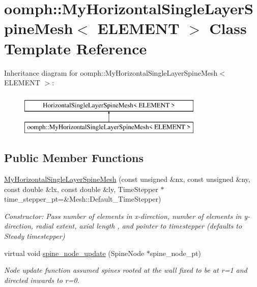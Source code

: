 \hypertarget{classoomph_1_1MyHorizontalSingleLayerSpineMesh}{}\section{oomph\+:\+:My\+Horizontal\+Single\+Layer\+Spine\+Mesh$<$ E\+L\+E\+M\+E\+NT $>$ Class Template Reference}
\label{classoomph_1_1MyHorizontalSingleLayerSpineMesh}
Inheritance diagram for oomph\+:\+:My\+Horizontal\+Single\+Layer\+Spine\+Mesh$<$ E\+L\+E\+M\+E\+NT $>$\+:\begin{figure}[H]
\begin{center}
\leavevmode
\includegraphics[height=2.000000cm]{classoomph_1_1MyHorizontalSingleLayerSpineMesh}
\end{center}
\end{figure}
\subsection*{Public Member Functions}
\begin{DoxyCompactItemize}
\item 
\hyperlink{classoomph_1_1MyHorizontalSingleLayerSpineMesh_a0bd73ed947e30341144d081df52332b5}{My\+Horizontal\+Single\+Layer\+Spine\+Mesh} (const unsigned \&nx, const unsigned \&ny, const double \&lx, const double \&ly, Time\+Stepper $\ast$time\+\_\+stepper\+\_\+pt=\&Mesh\+::\+Default\+\_\+\+Time\+Stepper)
\begin{DoxyCompactList}\small\item\em Constructor\+: Pass number of elements in x-\/direction, number of elements in y-\/direction, radial extent, axial length , and pointer to timestepper (defaults to Steady timestepper) \end{DoxyCompactList}\item 
virtual void \hyperlink{classoomph_1_1MyHorizontalSingleLayerSpineMesh_ad007f1c20530cda9a495d89a4470772c}{spine\+\_\+node\+\_\+update} (Spine\+Node $\ast$spine\+\_\+node\+\_\+pt)
\begin{DoxyCompactList}\small\item\em Node update function assumed spines rooted at the wall fixed to be at r=1 and directed inwards to r=0. \end{DoxyCompactList}\end{DoxyCompactItemize}


